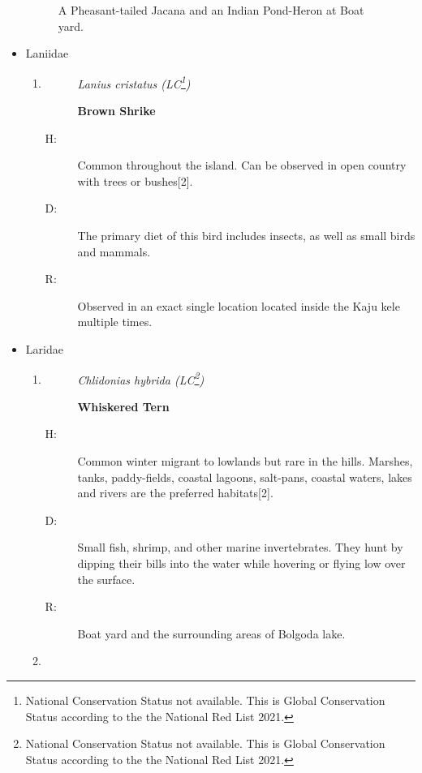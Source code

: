 \begin{itemize}
\begin{figure}[!htpb]
    \caption[]{A Pheasant-tailed Jacana and an Indian Pond-Heron at Boat yard.}
    \label{fig:figure-01}
\end{figure}
\item%
Laniidae%
\begin{enumerate}%
\item%
\begin{description}%
\item[]%
\textit{Lanius cristatus (LC\footnote{National Conservation Status not available. This is Global Conservation Status according to the the National Red List 2021.})}%
\item[]%
\textbf{Brown Shrike}%
\end{description}%
\begin{description}%
\item[H: ]%
Common throughout the island. Can be observed in open country with trees or bushes{[}2{]}.%
\item[D: ]%
The primary diet of this bird includes insects, as well as small birds and mammals.%
\item[R: ]%
Observed in an exact single location located inside the Kaju kele multiple times.%
\end{description}%
\end{enumerate}%
\item%
Laridae%
\begin{enumerate}%
\item%
\begin{description}%
\item[]%
\textit{Chlidonias hybrida (LC\footnote{National Conservation Status not available. This is Global Conservation Status according to the the National Red List 2021.})}%
\item[]%
\textbf{Whiskered Tern}%
\end{description}%
\begin{description}%
\item[H: ]%
Common winter migrant to lowlands but rare in the hills. Marshes, tanks, paddy-fields, coastal lagoons, salt{-}pans, coastal waters, lakes and rivers are the preferred habitats{[}2{]}.%
\item[D: ]%
Small fish, shrimp, and other marine invertebrates. They hunt by dipping their bills into the water while hovering or flying low over the surface.%
\item[R: ]%
Boat yard and the surrounding areas of Bolgoda lake.%
\end{description}%
\item%

\end{enumerate}
\end{itemize}
